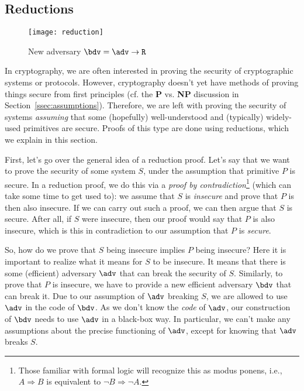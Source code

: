 \subsection{Reductions}

\begin{wrapfigure}{R}{0.6\textwidth}
\vspace{-0.5cm}
\begin{center}
\texttt{[image: reduction]}
\caption{\label{fig:reduction-example}New adversary $\bdv=\adv\circ\M{R}$}
\end{center}
\vspace{-0.5cm}
\end{wrapfigure}

In cryptography, we are often interested in proving the security of cryptographic systems or protocols. However, cryptography doesn't yet have methods of proving things secure from first principles (cf. the \textbf{P} vs. \textbf{NP} discussion in Section~\ref{ssec:assumptions}). Therefore, we are left with proving the security of systems \emph{assuming} that some (hopefully) well-understood and (typically) widely-used primitives are secure. Proofs of this type are done using reductions, which we explain in this section.

First, let's go over the general idea of a reduction proof.
Let's say that we want to prove the security of some system $S$, under the assumption that primitive $P$ is secure. In a reduction proof, we do this via a \emph{proof by contradiction}\footnote{Those familiar with formal logic will recognize this as modus ponens, i.e., $A\Rightarrow B$ is equivalent to $\neg B\Rightarrow \neg A$.} (which can take some time to get used to): we assume that $S$ is \emph{insecure} and prove that $P$ is then also insecure. If we can carry out such a proof, we can then argue that $S$ is secure. After all, if $S$ were insecure, then our proof would say that $P$ is also insecure, which is this in contradiction to our assumption that $P$ is \emph{secure}.

So, how do we prove that $S$ being insecure implies $P$ being insecure? Here it is important to realize what it means for $S$ to be insecure. It means that there is some (efficient) adversary $\adv$ that can break the security of $S$. Similarly, to prove that $P$ is insecure, we have to provide a new efficient adversary $\bdv$ that can break it. Due to our assumption of $\adv$ breaking $S$, we are allowed to use $\adv$ in the code of $\bdv$. As we don't know the \emph{code} of $\adv$, our construction of $\bdv$ needs to use $\adv$ in a black-box way. In particular, we can't make any assumptions about the precise functioning of $\adv$, except for knowing that $\adv$ breaks $S$.


